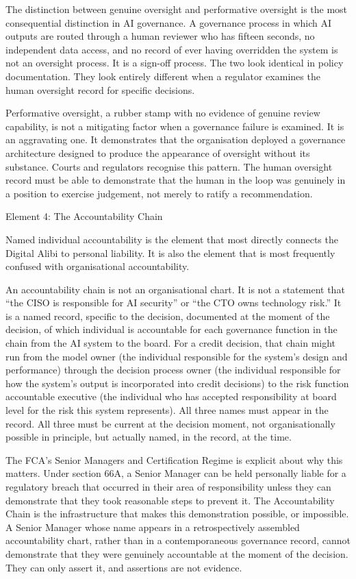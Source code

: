 The distinction between genuine oversight and performative oversight is the most consequential distinction in AI governance. A governance process in which AI outputs are routed through a human reviewer who has fifteen seconds, no independent data access, and no record of ever having overridden the system is not an oversight process. It is a sign-off process. The two look identical in policy documentation. They look entirely different when a regulator examines the human oversight record for specific decisions.

Performative oversight, a rubber stamp with no evidence of genuine review capability, is not a mitigating factor when a governance failure is examined. It is an aggravating one. It demonstrates that the organisation deployed a governance architecture designed to produce the appearance of oversight without its substance. Courts and regulators recognise this pattern. The human oversight record must be able to demonstrate that the human in the loop was genuinely in a position to exercise judgement, not merely to ratify a recommendation.

Element 4: The Accountability Chain

Named individual accountability is the element that most directly connects the Digital Alibi to personal liability. It is also the element that is most frequently confused with organisational accountability.

An accountability chain is not an organisational chart. It is not a statement that ``the CISO is responsible for AI security'' or ``the CTO owns technology risk.'' It is a named record, specific to the decision, documented at the moment of the decision, of which individual is accountable for each governance function in the chain from the AI system to the board. For a credit decision, that chain might run from the model owner (the individual responsible for the system's design and performance) through the decision process owner (the individual responsible for how the system's output is incorporated into credit decisions) to the risk function accountable executive (the individual who has accepted responsibility at board level for the risk this system represents). All three names must appear in the record. All three must be current at the decision moment, not organisationally possible in principle, but actually named, in the record, at the time.

The FCA's Senior Managers and Certification Regime is explicit about why this matters. Under section 66A, a Senior Manager can be held personally liable for a regulatory breach that occurred in their area of responsibility unless they can demonstrate that they took reasonable steps to prevent it. The Accountability Chain is the infrastructure that makes this demonstration possible, or impossible. A Senior Manager whose name appears in a retrospectively assembled accountability chart, rather than in a contemporaneous governance record, cannot demonstrate that they were genuinely accountable at the moment of the decision. They can only assert it, and assertions are not evidence.


